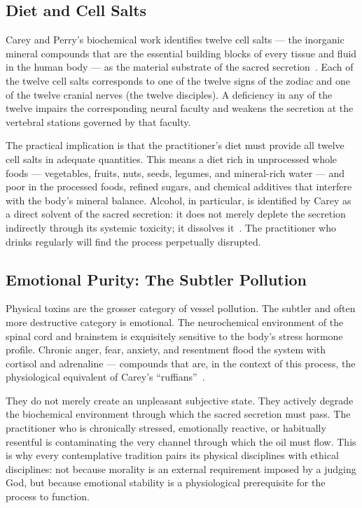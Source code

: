 \documentclass[12pt, a4paper]{article}
\begin{document}
\subsection{Diet and Cell Salts}

Carey and Perry's biochemical work identifies twelve cell salts — the inorganic
mineral compounds that are the essential building blocks of every tissue and
fluid in the human body — as the material substrate of the sacred
secretion~\autocite{carey1932}. Each of the twelve cell salts corresponds to
one of the twelve signs of the zodiac and one of the twelve cranial nerves (the
twelve disciples). A deficiency in any of the twelve impairs the corresponding
neural faculty and weakens the secretion at the vertebral stations governed by
that faculty.

The practical implication is that the practitioner's diet must provide all
twelve cell salts in adequate quantities. This means a diet rich in unprocessed
whole foods — vegetables, fruits, nuts, seeds, legumes, and mineral-rich
water — and poor in the processed foods, refined sugars, and chemical
additives that interfere with the body's mineral balance. Alcohol, in
particular, is identified by Carey as a direct solvent of the sacred secretion:
it does not merely deplete the secretion indirectly through its systemic
toxicity; it dissolves it~\autocite[112]{carey1920}. The practitioner who
drinks regularly will find the process perpetually disrupted.

\subsection{Emotional Purity: The Subtler Pollution}

Physical toxins are the grosser category of vessel pollution. The subtler and
often more destructive category is emotional. The neurochemical environment of
the spinal cord and brainstem is exquisitely sensitive to the body's stress
hormone profile. Chronic anger, fear, anxiety, and resentment flood the system
with cortisol and adrenaline — compounds that are, in the context of this
process, the physiological equivalent of Carey's ``ruffians''~\autocite{leproult1997}.

They do not merely create an unpleasant subjective state. They actively
degrade the biochemical environment through which the sacred secretion must
pass. The practitioner who is chronically stressed, emotionally reactive, or
habitually resentful is contaminating the very channel through which the oil
must flow. This is why every contemplative tradition pairs its physical
disciplines with ethical disciplines: not because morality is an external
requirement imposed by a judging God, but because emotional stability is a
physiological prerequisite for the process to function.
\end{document}
